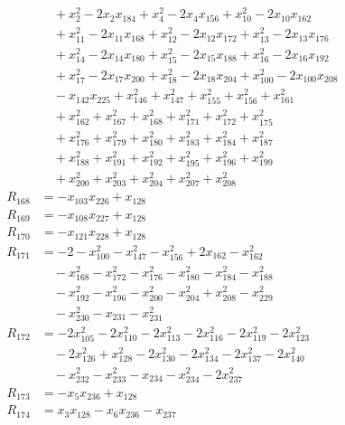 \begin{align*}
&\quad{}+x_{2}^{2}-2x_{2}x_{184}+x_{4}^{2}-2x_{4}x_{156}+x_{10}^{2}-2x_{10}x_{162}\\
&\quad{}+x_{11}^{2}-2x_{11}x_{168}+x_{12}^{2}-2x_{12}x_{172}+x_{13}^{2}-2x_{13}x_{176}\\
&\quad{}+x_{14}^{2}-2x_{14}x_{180}+x_{15}^{2}-2x_{15}x_{188}+x_{16}^{2}-2x_{16}x_{192}\\
&\quad{}+x_{17}^{2}-2x_{17}x_{200}+x_{18}^{2}-2x_{18}x_{204}+x_{100}^{2}-2x_{100}x_{208}\\
&\quad{}-x_{142}x_{225}+x_{146}^{2}+x_{147}^{2}+x_{155}^{2}+x_{156}^{2}+x_{161}^{2}\\
&\quad{}+x_{162}^{2}+x_{167}^{2}+x_{168}^{2}+x_{171}^{2}+x_{172}^{2}+x_{175}^{2}\\
&\quad{}+x_{176}^{2}+x_{179}^{2}+x_{180}^{2}+x_{183}^{2}+x_{184}^{2}+x_{187}^{2}\\
&\quad{}+x_{188}^{2}+x_{191}^{2}+x_{192}^{2}+x_{195}^{2}+x_{196}^{2}+x_{199}^{2}\\
&\quad{}+x_{200}^{2}+x_{203}^{2}+x_{204}^{2}+x_{207}^{2}+x_{208}^{2}\\
R_{168}&=-x_{103}x_{226}+x_{128}\\
R_{169}&=-x_{108}x_{227}+x_{128}\\
R_{170}&=-x_{121}x_{228}+x_{128}\\
R_{171}&=-2-x_{100}^{2}-x_{147}^{2}-x_{156}^{2}+2x_{162}-x_{162}^{2}\\
&\quad{}-x_{168}^{2}-x_{172}^{2}-x_{176}^{2}-x_{180}^{2}-x_{184}^{2}-x_{188}^{2}\\
&\quad{}-x_{192}^{2}-x_{196}^{2}-x_{200}^{2}-x_{204}^{2}+x_{208}^{2}-x_{229}^{2}\\
&\quad{}-x_{230}^{2}-x_{231}-x_{231}^{2}\\
R_{172}&=-2x_{105}^{2}-2x_{110}^{2}-2x_{113}^{2}-2x_{116}^{2}-2x_{119}^{2}-2x_{123}^{2}\\
&\quad{}-2x_{126}^{2}+x_{128}^{2}-2x_{130}^{2}-2x_{134}^{2}-2x_{137}^{2}-2x_{140}^{2}\\
&\quad{}-x_{232}^{2}-x_{233}^{2}-x_{234}-x_{234}^{2}-2x_{237}^{2}\\
R_{173}&=-x_{5}x_{236}+x_{128}\\
R_{174}&=x_{3}x_{128}-x_{6}x_{236}-x_{237}\\
\end{align*}
\endgroup
